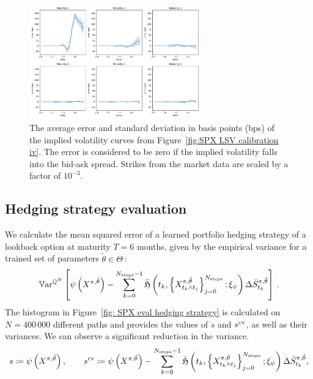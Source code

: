 \begin{figure}[H]
  \centering 
	\includegraphics[clip, width=0.66\textwidth]{content/reschap1/Figures/figures_SPX/iv_error_unbounded.pdf}
  \caption{The average error and standard deviation in basis points (bps) of the implied volatility curves from Figure~\ref{fig:SPX LSV calibration iv}. The error is considered to be zero if the implied volatility falls into the bid-ask spread. Strikes from the market data are scaled by a factor of $10^{-3}$.  
}
\label{fig:SPX LSV calibration iv error}  
\end{figure}


\subsection{Hedging strategy evaluation}
We calculate the mean squared error of a learned portfolio hedging strategy of a lookback option at maturity $T=6$ months, given by the empirical variance for a trained set of parameters $\tilde{\theta}\in\Theta\,$:
\[
\mathbb{V}\mathrm{ar}^{\mathbb{Q}^N} \left[ \psi\left(X^{\pi,\tilde{\theta}}\right)-\sum_{k=0}^{N_{\text{steps}}-1} \bar{\mathfrak{H}}\left(t_k, \left\{X_{t_k\wedge t_j}^{\pi,\tilde{\theta}}\right\}_{j=0}^{N_{\text{steps}}}; \xi_{\psi}\right)\Delta \bar S^{\pi,\tilde{\theta}}_{t_{k}} \right] \,.
\]
The histogram in Figure~\ref{fig: SPX eval hedging strategy} is calculated on $N=400\, 000$ different paths and provides the values of $s$ and $s^{\textup{cv}}$, as well as their variances. We can observe a significant reduction in the variance. 
\[
s\coloneqq\psi\left(X^{\pi,\tilde{\theta}}\right), \qquad
s^{\textup{cv}}\coloneqq \psi\left(X^{\pi,\tilde{\theta}}\right)-\sum_{k=0}^{N_{\text{steps}}-1} \bar{\mathfrak{H}}\left(t_k, \left\{X_{t_k\wedge t_j}^{\pi,\tilde{\theta}}\right\}_{j=0}^{N_{\text{steps}}}; \xi_{\psi}\right)\Delta \bar S^{\pi,\tilde{\theta}}_{t_{k}},
\]

